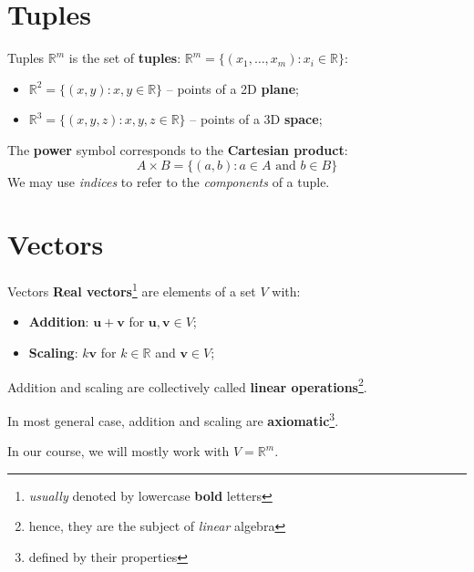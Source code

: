 \documentclass[10pt]{beamer}
\begin{document}
\section{Tuples}
\begin{frame}{Tuples}
    $\mathbb R^m$ is the set of \textbf{tuples}: $\mathbb R^m = \{(x_1,\dots,x_m) : x_i \in \mathbb R\}$:

    \begin{itemize}
        \item $\mathbb R^2 = \{(x, y) : x, y \in \mathbb R\}$ -- points of a 2D \textbf{plane};
        \item $\mathbb R^3 = \{(x, y, z): x, y, z \in \mathbb R\}$ -- points of a 3D \textbf{space};
    \end{itemize}

    The \textbf{power} symbol corresponds to the \textbf{Cartesian product}:
    $$
    A \times B = \{(a, b) : a \in A \text{ and } b \in B\}
    $$
    We may use \textit{indices} to refer to the \textit{components} of a tuple.
\end{frame}

\section{Vectors}
\begin{frame}{Vectors}
    \textbf{Real vectors}\footnote{\textit{usually} denoted by lowercase \textbf{bold} letters} are elements of a set $V$ with:

    \begin{itemize}
        \item \textbf{Addition}: $\mathbf{u} + \mathbf{v}$ for $\mathbf{u}, \mathbf{v} \in V$;
        \item \textbf{Scaling}: $k \mathbf{v}$ for $k \in \mathbb R$ and $\mathbf{v} \in V$;
    \end{itemize}

    Addition and scaling are collectively called \textbf{linear operations}\footnote{hence, they are the subject of \textit{linear} algebra}.

    In most general case, addition and scaling are \textbf{axiomatic}\footnote{defined by their properties}.

    In our course, we will mostly work with $V = \mathbb R^m$.
\end{frame}
\end{document}
